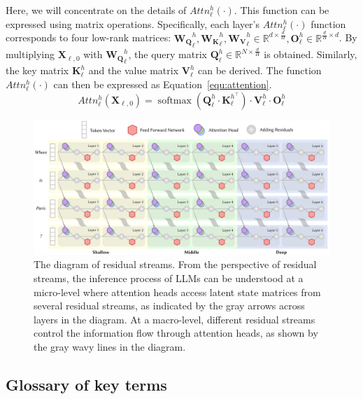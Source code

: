 \documentclass[12pt,letterpaper]{article}
\begin{document}
Here, we will concentrate on the details of $Attn_{\ell}^{h}\left(\cdot\right)$. This function can be expressed using matrix operations.
Specifically, each layer's $Attn_{\ell}^{h}\left(\cdot\right)$ function corresponds to four low-rank matrices: $\mathbf{W_Q}_{\ell}^{h}, \mathbf{W_K}_{\ell}^{h}, \mathbf{W_V}_{\ell}^{h} \in \mathbb{R}^{d \times \frac{d}{H}}, \mathbf{O}_{\ell}^{h} \in \mathbb{R}^{\frac{d}{H} \times d}$. By multiplying $\mathbf{X}_{\ell,0}$ with $\mathbf{W_Q}_{\ell}^{h}$, the query matrix $\mathbf{Q}_{\ell}^{h} \in \mathbb{R}^{N \times \frac{d}{H}}$ is obtained. Similarly, the key matrix $\mathbf{K}_{\ell}^{h}$ and the value matrix $\mathbf{V}_{\ell}^{h}$ can be derived.
The function $Attn_{\ell}^{h}\left(\cdot\right)$ can then be expressed as Equation~\ref{equ:attention}.\citep{AttentionIsAllYouNeed}
\begin{equation} \label{equ:attention}
    Attn_{\ell}^{h}\left(\mathbf{X}_{\ell,0}\right) = \operatorname{softmax}\left(\mathbf{Q}_{\ell}^{h} \cdot \mathbf{K}_{\ell}^{h^\top}\right) \cdot \mathbf{V}_{\ell}^{h} \cdot \mathbf{O}_{\ell}^{h}
\end{equation}

\begin{figure}[htbp]
    \centering
    \includegraphics[width=\linewidth]{figures/residual_stream.pdf}
    \caption{The diagram of residual streams. From the perspective of residual streams, the inference process of LLMs can be understood at a micro-level where attention heads access latent state matrices from several residual streams, as indicated by the gray arrows across layers in the diagram. At a macro-level, different residual streams control the information flow through attention heads, as shown by the gray wavy lines in the diagram.}
    \label{fig:ResidualStream}
\end{figure}


\subsection*{Glossary of key terms} \label{subsec:KeyTerm}

\end{document}
